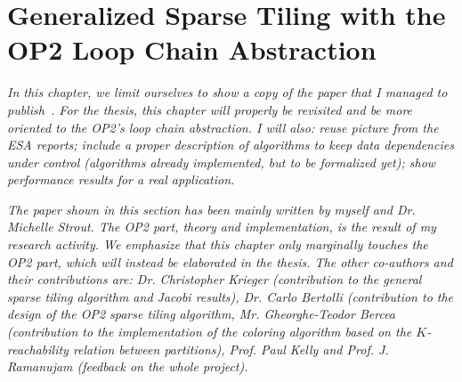 \chapter{Generalized Sparse Tiling with the OP2 Loop Chain Abstraction}
\label{ch:sparsetiling}

\textit{In this chapter, we limit ourselves to show a copy of the paper that I managed to publish~\citep{Luporini-tiling}. For the thesis, this chapter will properly be revisited and be more oriented to the OP2's loop chain abstraction. I will also: reuse picture from the ESA reports; include a proper description of algorithms to keep data dependencies under control (algorithms already implemented, but to be formalized yet); show performance results for a real application.}

\textit{The paper shown in this section has been mainly written by myself and Dr. Michelle Strout. The OP2 part, theory and implementation, is the result of my research activity. We emphasize that this chapter only marginally touches the OP2 part, which will instead be elaborated in the thesis. The other co-authors and their contributions are: Dr. Christopher Krieger (contribution to the general sparse tiling algorithm and Jacobi results), Dr. Carlo Bertolli (contribution to the design of the OP2 sparse tiling algorithm, Mr. Gheorghe-Teodor Bercea (contribution to the implementation of the coloring algorithm based on the $K$-reachability relation between partitions), Prof. Paul Kelly and Prof. J. Ramanujam (feedback on the whole project).}

